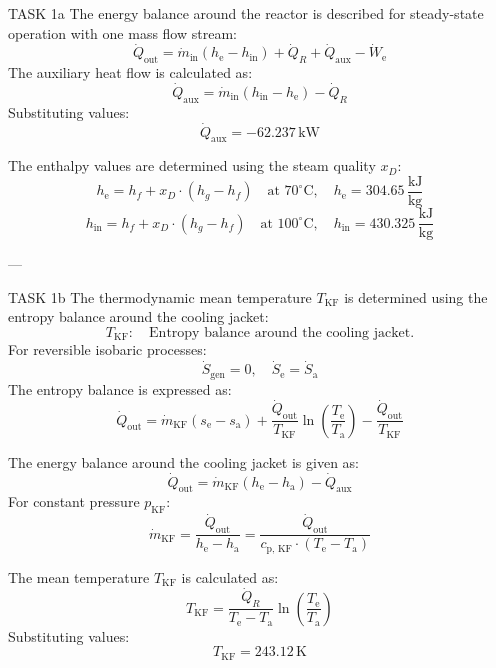 TASK 1a  
The energy balance around the reactor is described for steady-state operation with one mass flow stream:  
\[
\dot{Q}_{\text{out}} = \dot{m}_{\text{in}} \left( h_{\text{e}} - h_{\text{in}} \right) + \dot{Q}_R + \dot{Q}_{\text{aux}} - \dot{W}_{\text{e}}
\]  
The auxiliary heat flow is calculated as:  
\[
\dot{Q}_{\text{aux}} = \dot{m}_{\text{in}} \left( h_{\text{in}} - h_{\text{e}} \right) - \dot{Q}_R  
\]  
Substituting values:  
\[
\dot{Q}_{\text{aux}} = -62.237 \, \text{kW}
\]  

The enthalpy values are determined using the steam quality \( x_D \):  
\[
h_{\text{e}} = h_f + x_D \cdot (h_g - h_f) \quad \text{at } 70^\circ\text{C}, \quad h_{\text{e}} = 304.65 \, \frac{\text{kJ}}{\text{kg}}
\]  
\[
h_{\text{in}} = h_f + x_D \cdot (h_g - h_f) \quad \text{at } 100^\circ\text{C}, \quad h_{\text{in}} = 430.325 \, \frac{\text{kJ}}{\text{kg}}
\]  

---

TASK 1b  
The thermodynamic mean temperature \( T_{\text{KF}} \) is determined using the entropy balance around the cooling jacket:  
\[
T_{\text{KF}}: \quad \text{Entropy balance around the cooling jacket.}
\]  
For reversible isobaric processes:  
\[
\dot{S}_{\text{gen}} = 0, \quad \dot{S}_{\text{e}} = \dot{S}_{\text{a}}
\]  
The entropy balance is expressed as:  
\[
\dot{Q}_{\text{out}} = \dot{m}_{\text{KF}} \left( s_{\text{e}} - s_{\text{a}} \right) + \frac{\dot{Q}_{\text{out}}}{T_{\text{KF}}} \ln \left( \frac{T_{\text{e}}}{T_{\text{a}}} \right) - \frac{\dot{Q}_{\text{out}}}{T_{\text{KF}}}
\]  

The energy balance around the cooling jacket is given as:  
\[
\dot{Q}_{\text{out}} = \dot{m}_{\text{KF}} \left( h_{\text{e}} - h_{\text{a}} \right) - \dot{Q}_{\text{aux}}
\]  
For constant pressure \( p_{\text{KF}} \):  
\[
\dot{m}_{\text{KF}} = \frac{\dot{Q}_{\text{out}}}{h_{\text{e}} - h_{\text{a}}} = \frac{\dot{Q}_{\text{out}}}{c_{\text{p, KF}} \cdot (T_{\text{e}} - T_{\text{a}})}
\]  

The mean temperature \( T_{\text{KF}} \) is calculated as:  
\[
T_{\text{KF}} = \frac{\dot{Q}_R}{T_{\text{e}} - T_{\text{a}}} \ln \left( \frac{T_{\text{e}}}{T_{\text{a}}} \right)  
\]  
Substituting values:  
\[
T_{\text{KF}} = 243.12 \, \text{K}
\]